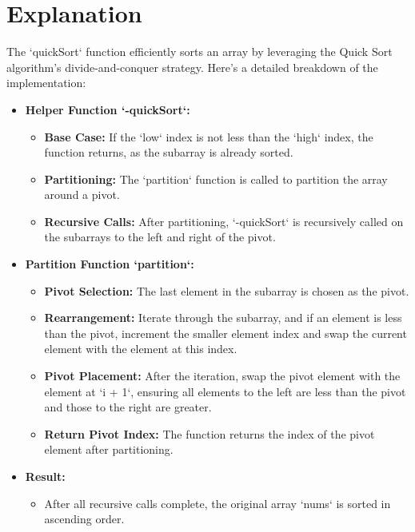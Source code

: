\section*{Explanation}
The `quickSort` function efficiently sorts an array by leveraging the Quick Sort algorithm's divide-and-conquer strategy. Here's a detailed breakdown of the implementation:

\begin{itemize}
    \item \textbf{Helper Function `-quickSort`:}
    \begin{itemize}
        \item \textbf{Base Case:} If the `low` index is not less than the `high` index, the function returns, as the subarray is already sorted.
        \item \textbf{Partitioning:} The `partition` function is called to partition the array around a pivot.
        \item \textbf{Recursive Calls:} After partitioning, `-quickSort` is recursively called on the subarrays to the left and right of the pivot.
    \end{itemize}
    
    \item \textbf{Partition Function `partition`:}
    \begin{itemize}
        \item \textbf{Pivot Selection:} The last element in the subarray is chosen as the pivot.
        \item \textbf{Rearrangement:} Iterate through the subarray, and if an element is less than the pivot, increment the smaller element index and swap the current element with the element at this index.
        \item \textbf{Pivot Placement:} After the iteration, swap the pivot element with the element at `i + 1`, ensuring all elements to the left are less than the pivot and those to the right are greater.
        \item \textbf{Return Pivot Index:} The function returns the index of the pivot element after partitioning.
    \end{itemize}
    
    \item \textbf{Result:}
    \begin{itemize}
        \item After all recursive calls complete, the original array `nums` is sorted in ascending order.
    \end{itemize}
\end{itemize}

